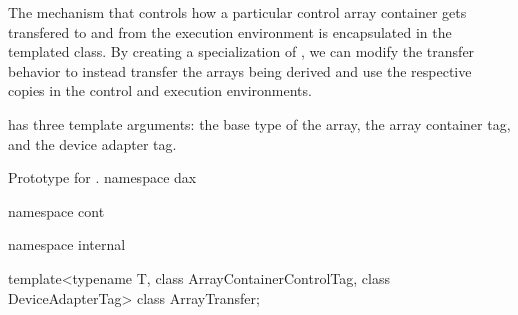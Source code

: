 The mechanism that controls how a particular control array container gets
transfered to and from the execution environment is encapsulated in the
templated  class. By creating a
specialization of , we can modify the
transfer behavior to instead transfer the arrays being derived and use the
respective copies in the control and execution environments.

 has three template arguments: the base type
of the array, the array container tag, and the device adapter tag.

\begin{daxexample}{Prototype for \protect{}.}
namespace dax {
namespace cont {
namespace internal {

template<typename T, class ArrayContainerControlTag, class DeviceAdapterTag>
class ArrayTransfer;

}
}
}
\end{daxexample}

